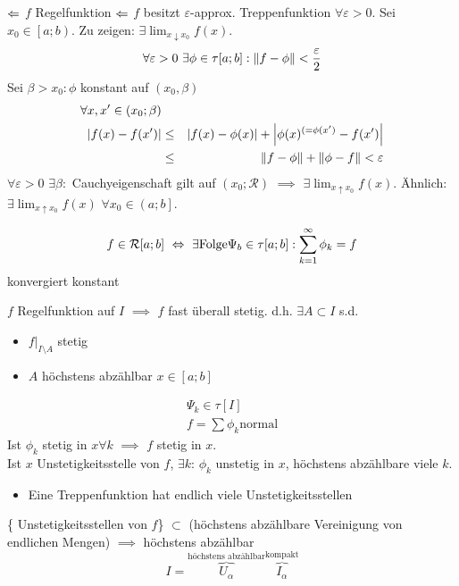 \begin{Bew}{$\Leftarrow$}
  $f$ Regelfunktion $\Leftarrow$ $f$ besitzt $\varepsilon$-approx. Treppenfunktion $\forall \varepsilon>0$. Sei $x_0\in\left[a;b\right)$. Zu zeigen: $\exists \lim_{x\downarrow x_0} f(x)$.
  \begin{align*}
    \forall \varepsilon>0\ \exists\phi\in \tau[a;b]:\left\| f-\phi \right\|<\frac{\varepsilon}{2}\\
  \end{align*}
  Sei $\beta>x_0:\phi$ konstant auf $(x_0,\beta)$
  \begin{align*}
    \forall x,x'\in(x_0;\beta)\\
    \left| f(x)-f(x') \right|&\leq& \left| f(x)-\phi(x) \right|+\left| \phi(x)^{(=\phi(x')}-f(x') \right|\\
    &\leq&\left\| f-\phi \right\|+\left\| \phi-f \right\|<\varepsilon
  \end{align*}
  $\forall \varepsilon>0$ $\exists\beta:$ Cauchyeigenschaft gilt auf $(x_0;\mathcal{R})$ $\implies$ $\exists \lim_{x\uparrow x_0}f(x)$. Ähnlich: $\exists\lim_{x\uparrow x_0}f(x)$ $\forall x_0\in\left(a;b\right]$.
\end{Bew}
\begin{Kor}
  \[f\in \mathcal{R}[a;b]\ \Leftrightarrow\ \exists \text{Folge}\Psi_b\in\tau[a;b]:\sum^\infty_{k=1}\phi_k=f\]
  konvergiert konstant
\end{Kor}
\begin{Kor}
  $f$ Regelfunktion auf $I$ $\implies$ $f$ fast überall stetig. d.h. $\exists A\subset I$ s.d.
  \begin{itemize}
    \item $f|_{I\setminus A}$ stetig
    \item $A$ höchstens abzählbar $x\in[a;b]$
  \end{itemize}
\end{Kor}
\begin{Bew}
  \begin{align*}
    \Psi_k\in\tau [I]\\
    f=\sum\phi_k \text{normal}
  \end{align*}
  Ist $\phi_k$ stetig in $x\forall k$ $\implies$ $f$ stetig in $x$.\\
  Ist $x$ Unstetigkeitsstelle von $f$, $\exists k$: $\phi_k$ unstetig in $x$, höchstens abzählbare viele $k$.
  \begin{itemize}
    \item Eine Treppenfunktion hat endlich viele Unstetigkeitsstellen
  \end{itemize}  
  \{ Unstetigkeitsstellen von $f$\} $\subset$ (höchstens abzählbare Vereinigung von endlichen Mengen) $\implies$ höchstens abzählbar
  \[I=\overbrace{U_\alpha}^{\text{höchstens abzählbar}}\overbrace{I_\alpha}^{\text{kompakt}}\]
\end{Bew}
